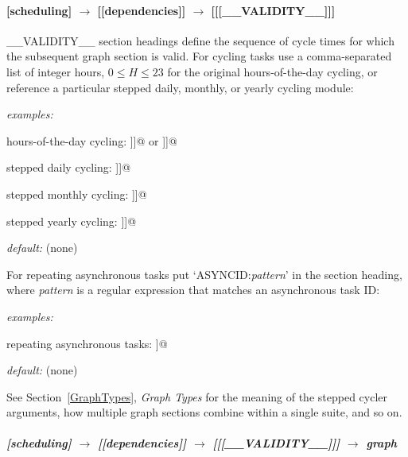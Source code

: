 \paragraph[{[[[}\_\_VALIDITY\_\_{]]]}]{[scheduling] $\rightarrow$ [[dependencies]] $\rightarrow$ [[[\_\_VALIDITY\_\_]]]}

\_\_VALIDITY\_\_ section headings define the sequence of cycle times for
which the subsequent graph section is valid. For cycling tasks use a
comma-separated list of integer hours, $0\leq H \leq 23$ for the original 
hours-of-the-day cycling, or reference a particular stepped daily,
monthly, or yearly cycling module:
\begin{myitemize}
    \item {\em examples:} 
        \begin{myitemize} 
            \item hours-of-the-day cycling: \lstinline@[[[0,6,12,18]]]@ or \lstinline@[[[HoursOfTheDay(0,6,12,18)]]]@ 
            \item stepped daily cycling: \lstinline@[[[Daily(20100823,2)]]]@ 
            \item stepped monthly cycling: \lstinline@[[[Monthly(201008,2)]]]@ 
            \item stepped yearly cycling: \lstinline@[[[Yearly(2010,2)]]]@ 
        \end{myitemize}
    \item {\em default:} (none)
\end{myitemize}
For repeating asynchronous tasks put `ASYNCID:{\em pattern}' in the
section heading, where {\em pattern} is a regular expression that
matches an asynchronous task ID:
\begin{myitemize}
    \item {\em examples:} 
        \begin{myitemize} 
            \item repeating asynchronous tasks: \lstinline@[[ASYNCID:SAT-\d+]]@ 
        \end{myitemize}
    \item {\em default:} (none)
\end{myitemize}

See Section~\ref{GraphTypes}, {\em Graph Types} for the meaning of the
stepped cycler arguments, how multiple graph sections combine within a
single suite, and so on.

\subparagraph[graph]{[scheduling] $\rightarrow$ [[dependencies]] $\rightarrow$ [[[\_\_VALIDITY\_\_]]] $\rightarrow$ graph }
\label{GraphDescrip}

